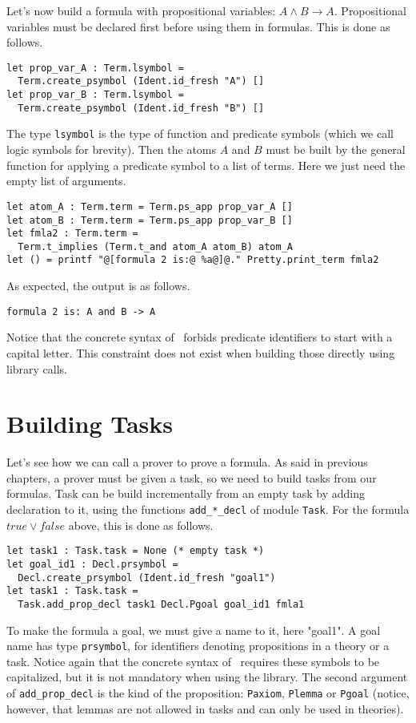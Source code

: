 Let's now build a formula with propositional variables: $A \land B
\rightarrow A$. Propositional variables must be declared first before
using them in formulas. This is done as follows.
\begin{verbatim}
let prop_var_A : Term.lsymbol =
  Term.create_psymbol (Ident.id_fresh "A") []
let prop_var_B : Term.lsymbol =
  Term.create_psymbol (Ident.id_fresh "B") []
\end{verbatim}
The type \texttt{lsymbol} is the type of function and predicate symbols (which
we call logic symbols for brevity). Then the atoms $A$ and $B$ must be built
by the general function for applying a predicate symbol to a list of terms.
Here we just need the empty list of arguments.
\begin{verbatim}
let atom_A : Term.term = Term.ps_app prop_var_A []
let atom_B : Term.term = Term.ps_app prop_var_B []
let fmla2 : Term.term =
  Term.t_implies (Term.t_and atom_A atom_B) atom_A
let () = printf "@[formula 2 is:@ %a@]@." Pretty.print_term fmla2
\end{verbatim}

As expected, the output is as follows.
\begin{verbatim}
formula 2 is: A and B -> A
\end{verbatim}
Notice that the concrete syntax of \why\ forbids predicate identifiers
to start with a capital letter. This constraint does not exist when
building those directly using library calls.

\section{Building Tasks}

Let's see how we can call a prover to prove a formula. As said in
previous chapters, a prover must be given a task, so we need to build
tasks from our formulas. Task can be build incrementally from an empty
task by adding declaration to it, using the functions
\texttt{add\_*\_decl} of module \texttt{Task}. For the formula $true \lor
false$ above, this is done as follows.
\begin{verbatim}
let task1 : Task.task = None (* empty task *)
let goal_id1 : Decl.prsymbol =
  Decl.create_prsymbol (Ident.id_fresh "goal1")
let task1 : Task.task =
  Task.add_prop_decl task1 Decl.Pgoal goal_id1 fmla1
\end{verbatim}
To make the formula a goal, we must give a name to it, here "goal1". A
goal name has type \texttt{prsymbol}, for identifiers denoting
propositions in a theory or a task. Notice again that the concrete
syntax of \why\ requires these symbols to be capitalized, but it is not
mandatory when using the library. The second argument of
\texttt{add\_prop\_decl} is the kind of the proposition:
\texttt{Paxiom}, \texttt{Plemma} or \texttt{Pgoal}
(notice, however, that lemmas are not allowed in tasks
and can only be used in theories).


